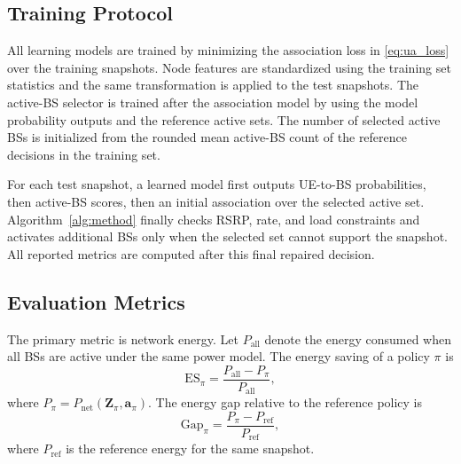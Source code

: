 \documentclass[journal]{IEEEtran}
\begin{document}
\subsection{Training Protocol}
All learning models are trained by minimizing the association loss in
\eqref{eq:ua_loss} over the training snapshots. Node features are standardized
using the training set statistics and the same transformation is applied to the
test snapshots. The active-BS selector is trained after the association model by
using the model probability outputs and the reference active sets. The number
of selected active BSs is initialized from the rounded mean active-BS count of
the reference decisions in the training set.

For each test snapshot, a learned model first outputs UE-to-BS probabilities,
then active-BS scores, then an initial association over the selected active set.
Algorithm~\ref{alg:method} finally checks RSRP, rate, and load constraints and
activates additional BSs only when the selected set cannot support the
snapshot. All reported metrics are computed after this final repaired decision.

\subsection{Evaluation Metrics}
The primary metric is network energy. Let
$P_{\mathrm{all}}$ denote the energy consumed when all BSs are active under the
same power model. The energy saving of a policy $\pi$ is
\begin{equation}
    \mathrm{ES}_{\pi}
    =
    \frac{P_{\mathrm{all}}-P_{\pi}}{P_{\mathrm{all}}},
    \label{eq:energy_saving_metric}
\end{equation}
where $P_{\pi}=P_{\mathrm{net}}(\mathbf{Z}_{\pi},\mathbf{a}_{\pi})$. The
energy gap relative to the reference policy is
\begin{equation}
    \mathrm{Gap}_{\pi}
    =
    \frac{P_{\pi}-P_{\mathrm{ref}}}{P_{\mathrm{ref}}},
    \label{eq:oracle_gap_metric}
\end{equation}
where $P_{\mathrm{ref}}$ is the reference energy for the same snapshot.
\end{document}
